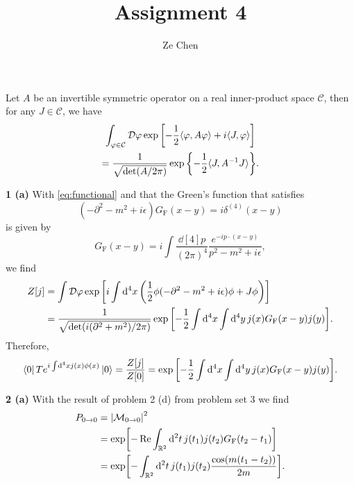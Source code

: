 \documentclass{article}
\title{Assignment 4}
\author{Ze Chen}
\makeatletter
\newcommand*{\shifttext}[1]{%
  \settowidth{\@tempdima}{#1}%
  \hspace{-\@tempdima}#1%
}
\newcommand{\plabel}[1]{%
\shifttext{\textbf{#1}\quad}%
}
\newcommand{\prule}{%
\begin{center}%
\hdashrule[0.5ex]{.99\linewidth}{1pt}{1pt 2.5pt}%
\end{center}%
}
\makeatother
\begin{document}
\maketitle

% 
% 

Let $A$ be an invertible symmetric operator on a real inner-product space $\mathcal{C}$, then for any $J\in \mathcal{C}$, we have
\begin{gather}
    \notag \int_{\varphi\in\mathcal{C}} \mathcal{D}\varphi \exp\qty[-\frac{1}{2}\langle \varphi, A\varphi \rangle + i\langle J,\varphi\rangle] \\
    \label{eq:functional} = \frac{1}{\sqrt{\det(A/2\pi)}} \exp\qty{-\frac{1}{2}\langle J, A^{-1} J\rangle}.
\end{gather}

\prule

\plabel{1 (a)}%
With \cref{eq:functional} and that the Green's function that satisfies
\[ (-\partial^2 - m^2 + i\epsilon) G_{\mathrm{F}}(x-y) = i\delta^{(4)}(x-y) \]
is given by
\[ G_{\mathrm{F}}(x-y) = i\int \frac{\dd[4]{p}}{(2\pi)^4} \frac{e^{-ip\cdot(x-y)}}{p^2 - m^2 + i\epsilon}, \]
we find
\begin{align*}
    Z[j] &= \int \mathcal{D}\varphi \exp\qty[i\int\dd[4]{x}\qty(\frac{1}{2}\phi(-\partial^2 - m^2 + i\epsilon)\phi + J\phi)] \\
    &= \frac{1}{\sqrt{\det(i(\partial^2 + m^2)/2\pi)}} \exp\qty[-\frac{1}{2}\int \dd[4]{x} \int\dd[4]{y} j(x)G_{\mathrm{F}}(x-y) j(y)].
\end{align*}
Therefore,
\begin{align*}
    \bra{0} Te^{i\int\dd[4]{x} j(x)\phi(x)} \ket{0} = \frac{Z[j]}{Z[0]} = \exp\qty[-\frac{1}{2}\int \dd[4]{x} \int\dd[4]{y} j(x)G_{\mathrm{F}}(x-y) j(y)].
\end{align*}

\prule

\plabel{2 (a)}%
With the result of problem 2 (d) from problem set 3 we find
\begin{align*}
    P_{0\rightarrow 0} &= \abs{\mathcal{M}_{0\rightarrow 0}}^2 \\
    &= \exp[-\Re\int_{\mathbb{R}^2} \dd{^2 t} j(t_1)j(t_2) G_{\mathrm{F}}(t_2 - t_1)] \\
    &= \exp[-\int_{\mathbb{R}^2} \dd{^2 t} j(t_1)j(t_2) \frac{\cos (m(t_1 - t_2))}{2m}].
\end{align*}
\end{document}
